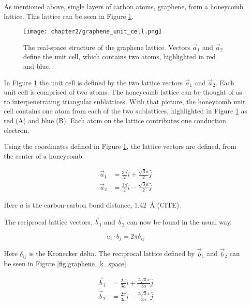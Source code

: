 As mentioned above, single layers of carbon atoms, graphene, form a honeycomb lattice. This lattice can be seen in Figure \ref{fig:graphene_unit_cell}.

\begin{figure}
    \centering
    \texttt{[image: chapter2/graphene\_unit\_cell.png]}
    \caption{The real-space structure of the graphene lattice. Vectors $\vec{a}_1$ and $\vec{a}_2$ define the unit cell, which contains two atoms, highlighted in red and blue.}
    \label{fig:graphene_unit_cell}
\end{figure}

In Figure \ref{fig:graphene_unit_cell} the unit cell is defined by the two lattice vectors $\vec{a}_1$ and $\vec{a}_2$. Each unit cell is comprised of two atoms. The honeycomb lattice can be thought of as to interpenetrating triangular sublattices. With that picture, the honeycomb unit cell contains one atom from each of the two sublattices, highlighted in Figure \ref{fig:graphene_unit_cell} as red (A) and blue (B). Each atom on the lattice contributes one conduction electron.

Using the coordinates defined in Figure \ref{fig:graphene_unit_cell}, the lattice vectors are defined, from the center of a honeycomb.

\begin{align}
    \vec{a}_1 &= \frac{3a}{2}\hat{i} + \frac{\sqrt{3}a}{2}\hat{j} \\
    \vec{a}_2 &= \frac{3a}{2}\hat{i} - \frac{\sqrt{3}a}{2}\hat{j}
\end{align}

Here $a$ is the carbon-carbon bond distance, \SI{1.42}{\angstrom} (CITE).

The reciprocal lattice vectors, $\vec{b}_1$ and $\vec{b}_2$ can now be found in the usual way.

\begin{equation}
    a_i \cdot b_j = 2\pi \delta_{ij}
\end{equation}

Here $\delta_{ij}$ is the Kronecker delta. The reciprocal lattice defined by $\vec{b}_1$ and $\vec{b}_2$ can be seen in Figure \ref{fig:graphene_k_space}.

\begin{align}
    \vec{b}_1 &= \frac{2\pi}{3a}\hat{i} + \frac{2\sqrt{3}\pi}{3a}\hat{j} \\
    \vec{b}_2 &= \frac{2\pi}{3a}\hat{i} - \frac{2\sqrt{3}\pi}{3a}\hat{j}
\end{align}

